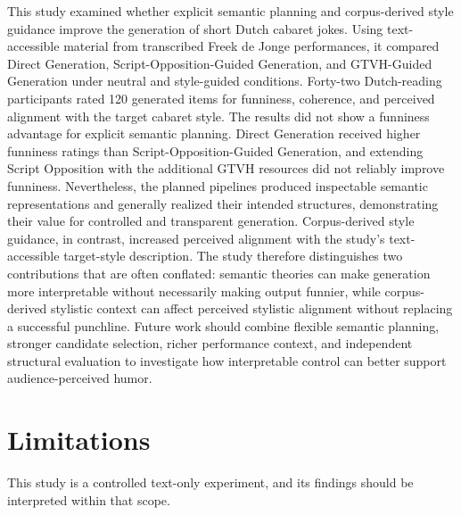 \documentclass[11pt]{article}
\begin{document}
This study examined whether explicit semantic planning and corpus-derived style guidance improve the generation of short Dutch cabaret jokes. Using text-accessible material from transcribed Freek de Jonge performances, it compared Direct Generation, Script-Opposition-Guided Generation, and GTVH-Guided Generation under neutral and style-guided conditions. Forty-two Dutch-reading participants rated 120 generated items for funniness, coherence, and perceived alignment with the target cabaret style. The results did not show a funniness advantage for explicit semantic planning. Direct Generation received higher funniness ratings than Script-Opposition-Guided Generation, and extending Script Opposition with the additional GTVH resources did not reliably improve funniness. Nevertheless, the planned pipelines produced inspectable semantic representations and generally realized their intended structures, demonstrating their value for controlled and transparent generation. Corpus-derived style guidance, in contrast, increased perceived alignment with the study's text-accessible target-style description. The study therefore distinguishes two contributions that are often conflated: semantic theories can make generation more interpretable without necessarily making output funnier, while corpus-derived stylistic context can affect perceived stylistic alignment without replacing a successful punchline. Future work should combine flexible semantic planning, stronger candidate selection, richer performance context, and independent structural evaluation to investigate how interpretable control can better support audience-perceived humor.

\section{Limitations}\label{limitations}

This study is a controlled text-only experiment, and its findings should be interpreted within that scope.
\end{document}
